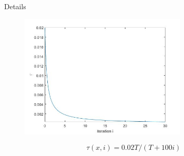 \begin{frame}{Details}
\begin{figure}[htbp]
\includegraphics[width=8cm]{./figs/tau.jpg}
\end{figure}
\begin{equation*}
\tau(x,i)=0.02T/(T+100i)
\end{equation*}
\end{frame}